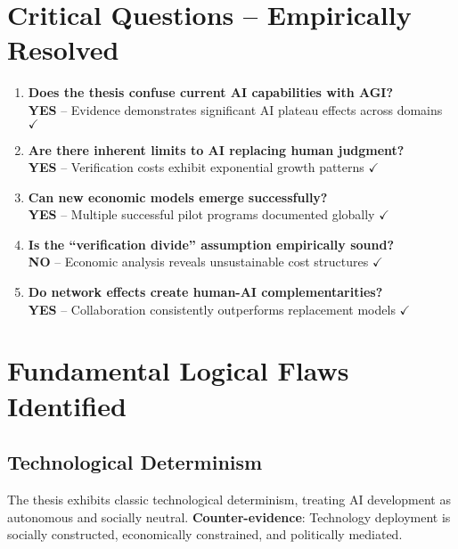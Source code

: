 \documentclass[11pt,a4paper]{article}
\newcommand{\greencheckmark}{\textcolor{successgreen}{\textbf{$\checkmark$}}}
\newcommand{\emphasis}[1]{\textbf{\textcolor{primaryblue}{#1}}}
\newcommand{\verdict}[1]{\textcolor{primaryblue}{\textbf{#1}}}
\begin{document}
\section{Critical Questions -- Empirically Resolved}

\begin{enumerate}[leftmargin=*]
\item \textbf{Does the thesis confuse current AI capabilities with AGI?} \\
  \verdict{YES} -- Evidence demonstrates significant AI plateau effects across domains \greencheckmark

\item \textbf{Are there inherent limits to AI replacing human judgment?} \\
  \verdict{YES} -- Verification costs exhibit exponential growth patterns \greencheckmark

\item \textbf{Can new economic models emerge successfully?} \\
  \verdict{YES} -- Multiple successful pilot programs documented globally \greencheckmark

\item \textbf{Is the ``verification divide'' assumption empirically sound?} \\
  \verdict{NO} -- Economic analysis reveals unsustainable cost structures \greencheckmark

\item \textbf{Do network effects create human-AI complementarities?} \\
  \verdict{YES} -- Collaboration consistently outperforms replacement models \greencheckmark
\end{enumerate}

\pagebreak
\section{Fundamental Logical Flaws Identified}

\subsection{Technological Determinism}

The thesis exhibits classic technological determinism, treating AI development as autonomous and socially neutral. \emphasis{Counter-evidence}: Technology deployment is socially constructed, economically constrained, and politically mediated.
\end{document}
